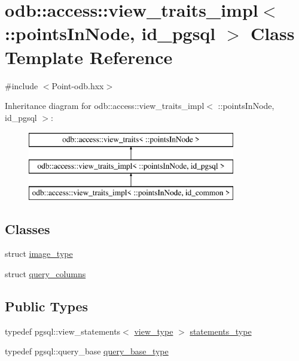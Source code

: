 \hypertarget{classodb_1_1access_1_1view__traits__impl_3_01_1_1points_in_node_00_01id__pgsql_01_4}{}\section{odb\+:\+:access\+:\+:view\+\_\+traits\+\_\+impl$<$ \+:\+:points\+In\+Node, id\+\_\+pgsql $>$ Class Template Reference}
\label{classodb_1_1access_1_1view__traits__impl_3_01_1_1points_in_node_00_01id__pgsql_01_4}


{\ttfamily \#include $<$Point-\/odb.\+hxx$>$}

Inheritance diagram for odb\+:\+:access\+:\+:view\+\_\+traits\+\_\+impl$<$ \+:\+:points\+In\+Node, id\+\_\+pgsql $>$\+:\begin{figure}[H]
\begin{center}
\leavevmode
\includegraphics[height=3.000000cm]{d2/d70/classodb_1_1access_1_1view__traits__impl_3_01_1_1points_in_node_00_01id__pgsql_01_4}
\end{center}
\end{figure}
\subsection*{Classes}
\begin{DoxyCompactItemize}
\item 
struct \hyperlink{structodb_1_1access_1_1view__traits__impl_3_01_1_1points_in_node_00_01id__pgsql_01_4_1_1image__type}{image\+\_\+type}
\item 
struct \hyperlink{structodb_1_1access_1_1view__traits__impl_3_01_1_1points_in_node_00_01id__pgsql_01_4_1_1query__columns}{query\+\_\+columns}
\end{DoxyCompactItemize}
\subsection*{Public Types}
\begin{DoxyCompactItemize}
\item 
typedef pgsql\+::view\+\_\+statements$<$ \hyperlink{classodb_1_1access_1_1view__traits_3_01_1_1points_in_node_01_4_ab9e8a9e1c7f74745131b794135c923b0}{view\+\_\+type} $>$ \hyperlink{classodb_1_1access_1_1view__traits__impl_3_01_1_1points_in_node_00_01id__pgsql_01_4_ab724377b3a60bdaca252110d3b00c989}{statements\+\_\+type}
\item 
typedef pgsql\+::query\+\_\+base \hyperlink{classodb_1_1access_1_1view__traits__impl_3_01_1_1points_in_node_00_01id__pgsql_01_4_a7f72312a936fa734ce3ed7e7102df78f}{query\+\_\+base\+\_\+type}
\end{DoxyCompactItemize}
